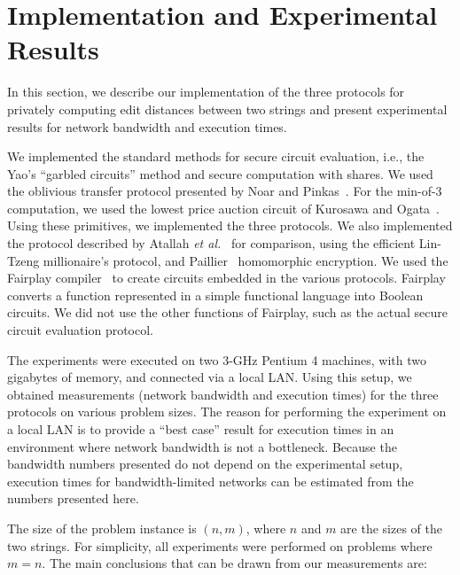 \section{Implementation and Experimental Results}
\label{sec:experimental} 

In this section, we describe our implementation of the three protocols
for privately computing edit distances between two strings and present
experimental results for network bandwidth and execution times.


We implemented the standard methods for secure circuit
evaluation, i.e., the Yao's ``garbled circuits'' method and secure computation
with shares.  We used the oblivious transfer protocol presented by Noar
and Pinkas~\cite{Naor-Pinkas:2001}.  For the min-of-3 computation, we used the lowest
price auction circuit of Kurosawa and Ogata~\cite{KO02}.
Using these primitives, we implemented the three protocols.  We also implemented the
protocol described by Atallah \textit{et al.}~\cite{atallah} for comparison, using the
efficient Lin-Tzeng \cite{lintzeng} millionaire's protocol, and Paillier~\cite{Paillier99}
homomorphic encryption. We used the
Fairplay compiler~\cite{Fairplay} to create circuits embedded in
the various protocols.  Fairplay converts a function
represented in a simple functional language into Boolean circuits.
We did not use the other functions of Fairplay, such as the actual secure circuit
evaluation protocol.

The experiments were executed on two 3-GHz Pentium 4 machines, with
two gigabytes of memory, and connected via a local LAN. Using this
setup, we obtained measurements (network bandwidth and execution
times) for the three protocols on various problem sizes. The reason
for performing the experiment on a local LAN is to provide a {}``best
case'' result for execution times in an environment where network
bandwidth is not a bottleneck. Because the bandwidth numbers presented
do not depend on the experimental setup, execution times for bandwidth-limited
networks can be estimated from the numbers presented here.

The size of the problem instance is $(n,m)$, where $n$ and $m$ are the
sizes of the two strings.  For simplicity, all experiments were performed
on problems where $m=n$.  The main conclusions that can be drawn from
our measurements are:

